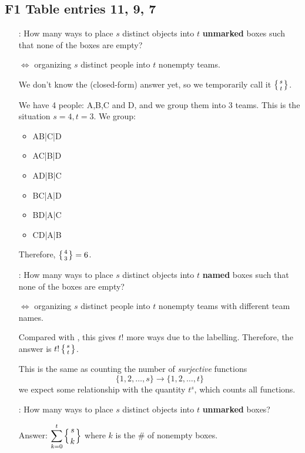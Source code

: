 \documentclass[12pt]{article}
\begin{document}
\subsection{F1 Table entries 11, 9, 7}
\begin{itemize}[align=left]
    \item[\circled{11}: ] How many ways to place $s$ distinct objects into $t$ \textbf{unmarked} boxes such that none of the boxes are empty?
    
    $\Leftrightarrow$ organizing $s$ distinct people into $t$ nonempty teams.
    
    We don't know the (closed-form) answer yet, so we temporarily call it $\left\{{s \atop t}\right\}$.

    \eg We have 4 people: A,B,C and D, and we group them into 3 teams. This is the situation $s=4,t=3$. We group:\begin{itemize}
        \item AB|C|D
        \item AC|B|D
        \item AD|B|C
        \item BC|A|D
        \item BD|A|C
        \item CD|A|B
    \end{itemize}
    Therefore, $\left\{{4 \atop 3}\right\}=6$.

    \item[\circled{9}: ] How many ways to place $s$ distinct objects into $t$ \textbf{named} boxes such that none of the boxes are empty?
    
    $\Leftrightarrow$ organizing $s$ distinct people into $t$ nonempty teams with different team names.

    Compared with , this gives $t!$ more ways due to the labelling. Therefore, the answer is $t!\left\{{s \atop t}\right\}$.

    \rmk This is the same as counting the number of \textit{surjective} functions $$\{1,2,\dots,s\}\to \{1,2,\dots, t\}$$ we expect some relationship with the quantity $t^s$, which counts all functions.

    \item[\circled{7}: ] How many ways to place $s$ distinct objects into $t$ \textbf{unmarked} boxes?
    
    Answer: \(\displaystyle \sum_{k=0}^{t}\left\{{s \atop k}\right\}\) where $k$ is the \# of nonempty boxes.
\end{itemize}
\end{document}
